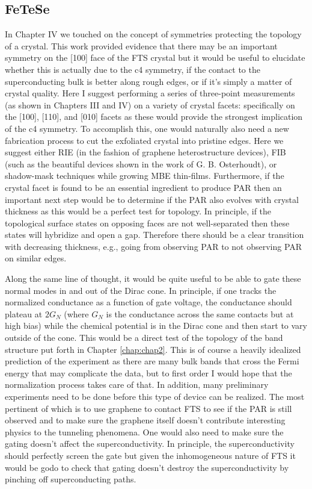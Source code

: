 \subsection{FeTeSe}
In Chapter IV we touched on the concept of symmetries protecting the topology of a crystal. This work provided evidence that there may be an important symmetry on the [100] face of the \ac{FTS} crystal but it would be useful to elucidate whether this is actually due to the c4 symmetry, if the contact to the superconducting bulk is better along rough edges, or if it's simply a matter of crystal quality. Here I suggest performing a series of three-point measurements (as shown in Chapters III and IV) on a variety of crystal facets: specifically on the [100], [110], and [010] facets as these would provide the strongest implication of the c4 symmetry. To accomplish this, one would naturally also need a new fabrication process to cut the exfoliated crystal into pristine edges. Here we suggest either RIE (in the fashion of graphene heterostructure devices), FIB (such as the beautiful devices shown in the work of G. B. Osterhoudt\cite{Osterhoudt2019}), or shadow-mask techniques while growing MBE thin-films. Furthermore, if the crystal facet is found to be an essential ingredient to produce \ac{PAR} then an important next step would be to determine if the \ac{PAR} also evolves with crystal thickness as this would be a perfect test for topology. In principle, if the topological surface states on opposing faces are not well-separated then these states will hybridize and open a gap. Therefore there should be a clear transition with decreasing thickness, e.g., going from observing \ac{PAR} to not observing \ac{PAR} on similar edges.\par
Along the same line of thought, it would be quite useful to be able to gate these normal modes in and out of the Dirac cone. In principle, if one tracks the normalized conductance as a function of gate voltage, the conductance should plateau at $2G_{N}$ (where $G_{N}$ is the conductance across the same contacts but at high bias) while the chemical potential is in the Dirac cone and then start to vary outside of the cone. This would be a direct test of the topology of the band structure put forth in Chapter \ref{chap:chap2}. This is of course a heavily idealized prediction of the experiment as there are many bulk bands that cross the Fermi energy that may complicate the data, but to first order I would hope that the normalization process takes care of that. In addition, many preliminary experiments need to be done before this type of device can be realized. The most pertinent of which is to use graphene to contact \ac{FTS} to see if the \ac{PAR} is still observed and to make sure the graphene itself doesn't contribute interesting physics to the tunneling phenomena. One would also need to make sure the gating doesn't affect the superconductivity. In principle, the superconductivity should perfectly screen the gate but given the inhomogeneous nature of \ac{FTS} it would be godo to check that gating doesn't destroy the superconductivity by pinching off superconducting paths.\par
